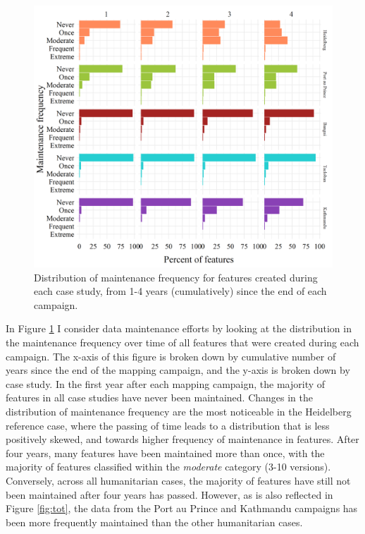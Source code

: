 \begin{figure} %
    \centering %
    \includegraphics[width = \textwidth]{Images/facetmaint.png} %
    \caption[Distribution of maintenance frequency for features created during each case study.]{Distribution of maintenance frequency for features created during each case study, from 1-4 years (cumulatively) since the end of each campaign.} %
    \label{fig:dist} %
\end{figure}

In Figure \ref{fig:dist} I consider data maintenance efforts by looking at the distribution in the maintenance frequency over time of all features that were created during each campaign. The x-axis of this figure is broken down by cumulative number of years since the end of the mapping campaign, and the y-axis is broken down by case study. In the first year after each mapping campaign, the majority of features in all case studies have never been maintained. Changes in the distribution of maintenance frequency are the most noticeable in the Heidelberg reference case, where the passing of time leads to a distribution that is less positively skewed, and towards higher frequency of maintenance in features. After four years, many features have been maintained more than once, with the majority of features classified within the \textit{moderate} category (3-10 versions). Conversely, across all humanitarian cases, the majority of features have still not been maintained after four years has passed. However, as is also reflected in Figure \ref{fig:tot}, the data from the Port au Prince and Kathmandu campaigns has been more frequently maintained than the other humanitarian cases. 

